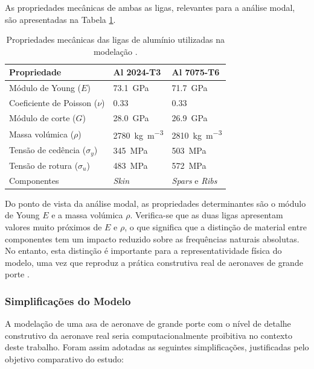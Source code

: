 \documentclass[a4paper,fleqn,noprintline]{cas-dc}
\begin{document}
As propriedades mecânicas de ambas as ligas, relevantes para a análise modal, são apresentadas na Tabela \ref{tab:materiais}.

\begin{table}[h!]
\centering
\caption{Propriedades mecânicas das ligas de alumínio utilizadas 
na modelação \cite{ASM2008}.}
\label{tab:materiais}
\renewcommand{\arraystretch}{1.4}
\begin{tabularx}{\textwidth}{p{4.5cm} X X}
\toprule
\textbf{Propriedade} & \textbf{Al 2024-T3} & \textbf{Al 7075-T6} \\
\midrule
Módulo de Young ($E$)           
    & \SI{73.1}{\giga\pascal}   
    & \SI{71.7}{\giga\pascal}   \\
Coeficiente de Poisson ($\nu$)  
    & $0.33$                    
    & $0.33$                    \\
Módulo de corte ($G$)           
    & \SI{28.0}{\giga\pascal}   
    & \SI{26.9}{\giga\pascal}   \\
Massa volúmica ($\rho$)         
    & \SI{2780}{\kilo\gram\per\cubic\meter}  
    & \SI{2810}{\kilo\gram\per\cubic\meter}  \\
Tensão de cedência ($\sigma_y$) 
    & \SI{345}{\mega\pascal}    
    & \SI{503}{\mega\pascal}    \\
Tensão de rotura ($\sigma_u$)   
    & \SI{483}{\mega\pascal}    
    & \SI{572}{\mega\pascal}    \\
Componentes                     
    & \textit{Skin}             
    & \textit{Spars} e \textit{Ribs} \\
\bottomrule
\end{tabularx}
\end{table}

Do ponto de vista da análise modal, as propriedades determinantes são o módulo de Young $E$ e a massa volúmica $\rho$. Verifica-se que as duas ligas apresentam valores muito próximos de $E$ e $\rho$, o que significa que a distinção de material entre componentes tem um impacto reduzido sobre as frequências naturais absolutas. No entanto, esta distinção é importante para a representatividade física do modelo, uma vez que reproduz a prática construtiva real de aeronaves de grande porte \cite{Megson2012}.

\subsubsection{Simplificações do Modelo}

A modelação de uma asa de aeronave de grande porte com o nível de detalhe construtivo da aeronave real seria computacionalmente proibitiva no contexto deste trabalho. Foram assim adotadas as seguintes simplificações, justificadas pelo objetivo comparativo do estudo:
\end{document}
